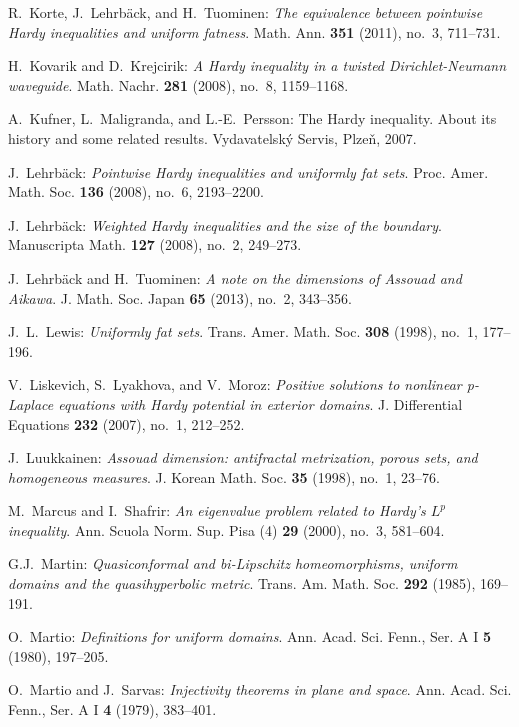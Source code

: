 \documentclass[10pt,leqno]{amsart}
\theoremstyle{definition}
\numberwithin{equation}{section}
\begin{document}
\begin{thebibliography}{11}
R.~Korte, J.~Lehrb\"ack, and H.~Tuominen: \emph{The equivalence between
pointwise Hardy inequalities and uniform fatness}.
Math. Ann. {\bf 351} (2011), no.~3, 711--731.

H.~Kovarik and D.~Krejcirik: \emph{A Hardy inequality in a twisted
Dirichlet-Neumann waveguide}.
Math. Nachr. {\bf 281} (2008), no.~8, 1159--1168.

A.~Kufner, L.~Maligranda, and L.-E.~Persson: The Hardy inequality. About
its history and some related results. Vydavatelsk\'y Servis, Plze\v n, 2007.

J.~Lehrb\"ack: \emph{Pointwise Hardy inequalities and uniformly fat sets}.
Proc. Amer. Math. Soc. {\bf 136} (2008), no.~6, 2193--2200.

J.~Lehrb\"ack: \emph{Weighted {H}ardy inequalities and the size of the
boundary}. Manuscripta Math. {\bf 127} (2008), no.~2, 249--273.

J.~Lehrb\"ack and H.~Tuominen: \emph{A note on the dimensions of {A}ssouad and
{A}ikawa}. J.
Math. Soc. Japan {\bf 65} (2013), no.~2, 343--356.

J.~L.~Lewis: \emph{Uniformly fat sets}. Trans. Amer. Math. Soc. {\bf 308}
(1998), no.~1, 177--196.

V.~Liskevich, S.~Lyakhova, and V.~Moroz: \emph{Positive solutions to nonlinear
p-Laplace equations with Hardy potential in exterior domains}. J. Differential
Equations {\bf 232} (2007), no.~1, 212--252.

J.~Luukkainen: \emph{Assouad dimension: antifractal metrization, porous sets,
and homogeneous measures}. J. Korean Math. Soc. {\bf 35} (1998), no.~1, 23--76.

M.~Marcus and I.~Shafrir: \emph{An eigenvalue problem related to Hardy's $L^p$
inequality}. Ann. Scuola Norm. Sup. Pisa (4) {\bf 29} (2000), no.~3, 581--604.

G.J.~Martin: 
\emph{Quasiconformal and bi-Lipschitz homeomorphisms, uniform domains and the
quasihyperbolic metric}.
Trans. Am. Math. Soc. {\bf 292} (1985),  169--191.

O.~Martio: \emph{Definitions for uniform domains}. Ann. Acad. Sci. Fenn., Ser. A
I {\bf 5} (1980), 197--205.

O.~Martio and J.~Sarvas:
\emph{Injectivity theorems in plane and space}. Ann. Acad. Sci. Fenn., Ser. A I
{\bf 4} (1979), 383--401.


\end{thebibliography}
\end{document}
